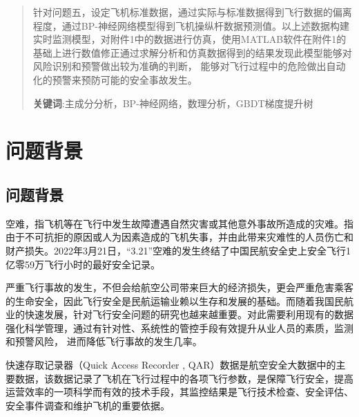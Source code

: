 \documentclass[UTF8]{ctexart}
\begin{document}
\begin{abstract}
		针对问题五，设定飞机标准数据，通过实际与标准数据得到飞行数据的偏离程度，通过BP-神经网络模型得到飞机操纵杆数据预测值。以上述数据构建实时监测模型，对附件1中的数据进行仿真，使用MATLAB软件在附件1的基础上进行数值修正通过求解分析和仿真数据得到的结果发现此模型能够对风险识别和预警做出较为准确的判断， 能够对飞行过程中的危险做出自动化的预警来预防可能的安全事故发生。\par
		\textbf{关键词}:\quad 主成分分析，BP-神经网络，数理分析，GBDT梯度提升树
	\end{abstract}
	
	\newpage
	\begin{spacing}{1.2}
	\tableofcontents
	\thispagestyle{empty}
	\end{spacing}
	\newpage
	\setcounter{page}{1}
	\pagestyle{plain}
	
	
	\section{问题背景}
	\subsection{问题背景}
	空难，指飞机等在飞行中发生故障遭遇自然灾害或其他意外事故所造成的灾难。指由于不可抗拒的原因或人为因素造成的飞机失事，并由此带来灾难性的人员伤亡和财产损失。2022年3月21日，“3.21”空难的发生终结了中国民航安全史上安全飞行1亿零59万飞行小时的最好安全记录。 \par
	严重飞行事故的发生，不但会给航空公司带来巨大的经济损失，更会严重危害乘客的生命安全，因此飞行安全是民航运输业赖以生存和发展的基础。而随着我国民航业的快速发展，针对飞行安全问题的研究也越来越重要。对此需要利用现有的数据强化科学管理，通过有针对性、系统性的管控手段有效提升从业人员的素质，监测和预警风险， 进而降低飞行事故的发生几率。 \par
	快速存取记录器（Quick Access Recorder , QAR）数据是航空安全大数据中的主要数据，该数据记录了飞机在飞行过程中的各项飞行参数，是保障飞行安全，提高运营效率的一项科学而有效的技术手段，其监控结果是飞行技术检查、安全评估、安全事件调查和维护飞机的重要依据。 \par
	
	
\end{document}
